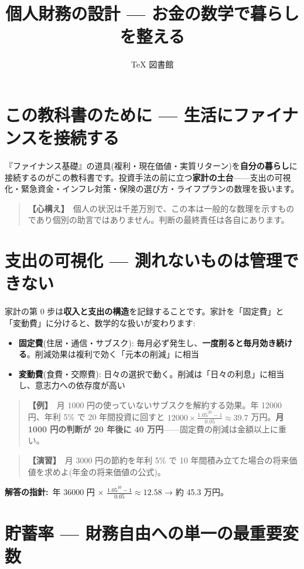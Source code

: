 \documentclass{article}
\title{個人財務の設計 — お金の数学で暮らしを整える}
\author{TeX 図書館}
\begin{document}
\section{この教科書のために — 生活にファイナンスを接続する}

『ファイナンス基礎』の道具(複利・現在価値・実質リターン)を\textbf{自分の暮らし}に接続するのがこの教科書です。投資手法の前に立つ\textbf{家計の土台}——支出の可視化・緊急資金・インフレ対策・保険の選び方・ライフプランの数理を扱います。

\begin{quote}
\textbf{【心構え】}\ 個人の状況は千差万別で、この本は一般的な数理を示すものであり個別の助言ではありません。判断の最終責任は各自にあります。
\end{quote}

\section{支出の可視化 — 測れないものは管理できない}

家計の第 0 步は\textbf{収入と支出の構造}を記録することです。家計を「固定費」と「変動費」に分けると、数学的な扱いが変わります:

\begin{itemize}
\item \textbf{固定費}(住居・通信・サブスク): 毎月必ず発生し、\textbf{一度削ると毎月効き続ける}。削減効果は複利で効く「元本の削減」に相当
\item \textbf{変動費}(食費・交際費): 日々の選択で動く。削減は「日々の利息」に相当し、意志力への依存度が高い
\end{itemize}

\begin{quote}
\textbf{【例】}\ 月 1000 円の使っていないサブスクを解約する効果。年 12000 円、年利 5\% で 20 年間投資に回すと \(12000 \times \frac{1.05^{20} - 1}{0.05} \approx 39.7\) 万円。\textbf{月 1000 円の判断が 20 年後に 40 万円}——固定費の削減は金額以上に重い。
\end{quote}

\begin{quote}
\textbf{【演習】}\ 月 3000 円の節約を年利 5\% で 10 年間積み立てた場合の将来価値を求めよ(年金の将来価値の公式)。
\end{quote}

\textbf{解答の指針:}\ 年 36000 円 × \(\frac{1.05^{10} - 1}{0.05} \approx 12.58\) → 約 45.3 万円。

\section{貯蓄率 — 財務自由への単一の最重要変数}
\end{document}
